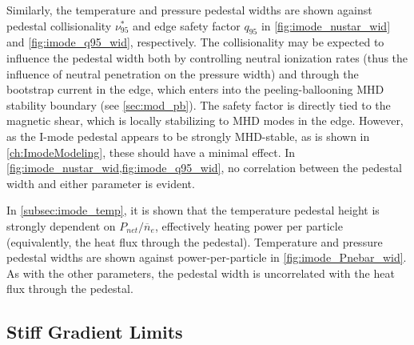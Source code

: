 Similarly, the temperature and pressure pedestal widths are shown against pedestal collisionality $\nu^*_{95}$ and edge safety factor $q_{95}$ in \cref{fig:imode_nustar_wid} and \cref{fig:imode_q95_wid}, respectively.  The collisionality may be expected to influence the pedestal width both by controlling neutral ionization rates (thus the influence of neutral penetration on the pressure width) and through the bootstrap current in the edge, which enters into the peeling-ballooning MHD stability boundary (see \cref{sec:mod_pb}).  The safety factor is directly tied to the magnetic shear, which is locally stabilizing to MHD modes in the edge.  However, as the I-mode pedestal appears to be strongly MHD-stable, as is shown in \cref{ch:ImodeModeling}, these should have a minimal effect.  In \cref{fig:imode_nustar_wid,fig:imode_q95_wid}, no correlation between the pedestal width and either parameter is evident.

In \cref{subsec:imode_temp}, it is shown that the temperature pedestal height is strongly dependent on $P_{net}/\overline{n}_e$, effectively heating power per particle (equivalently, the heat flux through the pedestal).  Temperature and pressure pedestal widths are shown against power-per-particle in \cref{fig:imode_Pnebar_wid}.  As with the other parameters, the pedestal width is uncorrelated with the heat flux through the pedestal.

\begin{figure}[t]
 \pushtooutside
\end{figure}

\subsection{Stiff Gradient Limits}\label{subsec:imode_wid_stiff}

